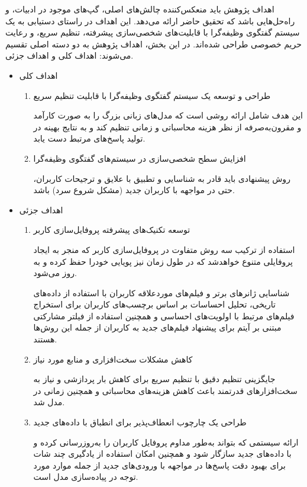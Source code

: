 اهداف پژوهش باید منعکس‌کننده چالش‌های اصلی، گپ‌های موجود در ادبیات، و راه‌حل‌هایی باشد که تحقیق حاضر ارائه می‌دهد. این اهداف در راستای دستیابی به یک سیستم گفتگوی وظیفه‌گرا با قابلیت‌های شخصی‌سازی پیشرفته، تنظیم سریع، و رعایت حریم خصوصی طراحی شده‌اند. در این بخش، اهداف پژوهش به دو دسته اصلی تقسیم می‌شوند: اهداف کلی و اهداف جزئی.

\begin{itemize}
\item
اهداف کلی
\begin{enumerate}
\item
طراحی و توسعه یک سیستم گفتگوی وظیفه‌گرا با قابلیت تنظیم سریع

این هدف شامل ارائه روشی است که مدل‌های زبانی بزرگ را به صورت کارآمد و مقرون‌به‌صرفه از نظر هزینه محاسباتی و زمانی تنظیم کند و به نتایج بهینه در تولید پاسخ‌های مرتبط دست یابد.
\item

افزایش سطح شخصی‌سازی در سیستم‌های گفتگوی وظیفه‌گرا

روش پیشنهادی باید قادر به شناسایی و تطبیق با علایق و ترجیحات کاربران، حتی در مواجهه با کاربران جدید (مشکل شروع سرد) باشد.
\end{enumerate}

\item
اهداف جزئی

\begin{enumerate}
\item
توسعه تکنیک‌های پیشرفته پروفایل‌سازی کاربر

استفاده از ترکیب سه روش متفاوت در پروفایل‌سازی کاربر که منجر به ایجاد پروفایلی متنوع خواهدشد که در طول زمان نیز پویایی خودرا حفظ کرده و به روز می‌شود.

شناسایی ژانرهای برتر و فیلم‌های موردعلاقه کاربران با استفاده از داده‌های تاریخی، تحلیل احساسات بر اساس برچسب‌های کاربران برای استخراج فیلم‌های مرتبط با اولویت‌های احساسی و همچنین استفاده از فیلتر مشارکتی مبتنی بر آیتم برای پیشنهاد فیلم‌های جدید به کاربران از جمله این روش‌ها هستند.

\item
کاهش مشکلات سخت‌افزاری و منابع مورد نیاز

جایگزینی تنظیم دقیق با تنظیم سریع برای کاهش بار پردازشی و نیاز به سخت‌افزارهای قدرتمند باعث کاهش هزینه‌های محاسباتی و همچنین زمانی در مدل شد.

\item
طراحی یک چارچوب انعطاف‌پذیر برای انطباق با داده‌های جدید

ارائه سیستمی که بتواند به‌طور مداوم پروفایل کاربران را به‌روزرسانی کرده و با داده‌های جدید سازگار شود و همچنین امکان استفاده از یادگیری چند شات برای بهبود دقت پاسخ‌ها در مواجهه با ورودی‌های جدید از جمله موارد مورد توجه در پیاده‌سازی مدل است.



\end{enumerate}
\end{itemize}

